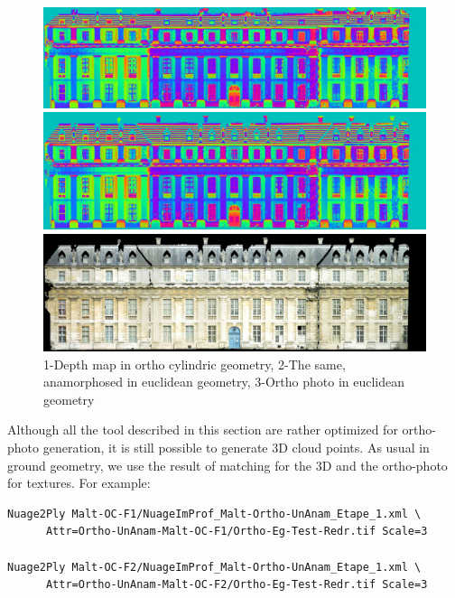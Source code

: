 \begin{figure}
\begin{center}
\includegraphics[width=160mm]{FIGS/Vincennes/MNE-OC.jpg}

\vspace{0.3cm}
\includegraphics[width=160mm]{FIGS/Vincennes/MEN-Eucl.jpg}

\vspace{0.3cm}
\includegraphics[width=160mm]{FIGS/Vincennes/Ortho-Eg-Test-Redr.jpg}

\end{center}
\caption{1-Depth map in ortho cylindric geometry, 2-The same, anamorphosed in euclidean
geometry, 3-Ortho photo in euclidean geometry}
\label{FIG:OK:Vincenne}
\end{figure}


Although all the tool described in this section are rather optimized
for ortho-photo generation, it is still possible to generate 3D cloud points.
As usual in ground geometry, we use the result of matching for the 3D and
the ortho-photo for textures.
For example:


\begin{verbatim}
Nuage2Ply Malt-OC-F1/NuageImProf_Malt-Ortho-UnAnam_Etape_1.xml \
      Attr=Ortho-UnAnam-Malt-OC-F1/Ortho-Eg-Test-Redr.tif Scale=3

Nuage2Ply Malt-OC-F2/NuageImProf_Malt-Ortho-UnAnam_Etape_1.xml \
      Attr=Ortho-UnAnam-Malt-OC-F2/Ortho-Eg-Test-Redr.tif Scale=3
\end{verbatim}


